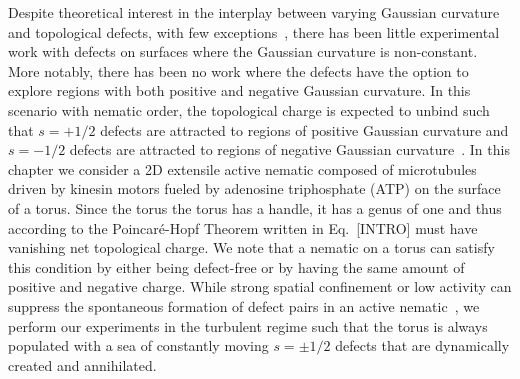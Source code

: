 Despite theoretical interest in the interplay between varying Gaussian curvature and topological defects, with few exceptions~\cite{RN84,RN25,RN73,RN81}, there has been little experimental work with defects on surfaces where the Gaussian curvature is non-constant.
More notably, there has been no work where the defects have the option to explore regions with both positive and negative Gaussian curvature.
In this scenario with nematic order, the topological charge is expected to unbind such that $s = +1/2$ defects are attracted to regions of positive Gaussian curvature and $s=  -1/2$ defects are attracted to regions of negative Gaussian curvature~\cite{RN17,RN19,RN22}.
In this chapter we consider a 2D extensile active nematic composed of microtubules driven by kinesin motors fueled by adenosine triphosphate (ATP) on the surface of a torus.
Since the torus the torus has a handle, it has a genus of one and thus according to the Poincar\'e-Hopf Theorem written in Eq.~[INTRO] must have vanishing net topological charge.
We note that a nematic on a torus can satisfy this condition by either being defect-free or by having the same amount of positive and negative charge.
While strong spatial confinement or low activity can suppress the spontaneous formation of defect pairs in an active nematic~\cite{RN9,RN247}, we perform our experiments in the turbulent regime such that the torus is always populated with a sea of constantly moving $s = \pm 1/2$ defects that are dynamically created and annihilated.\\

